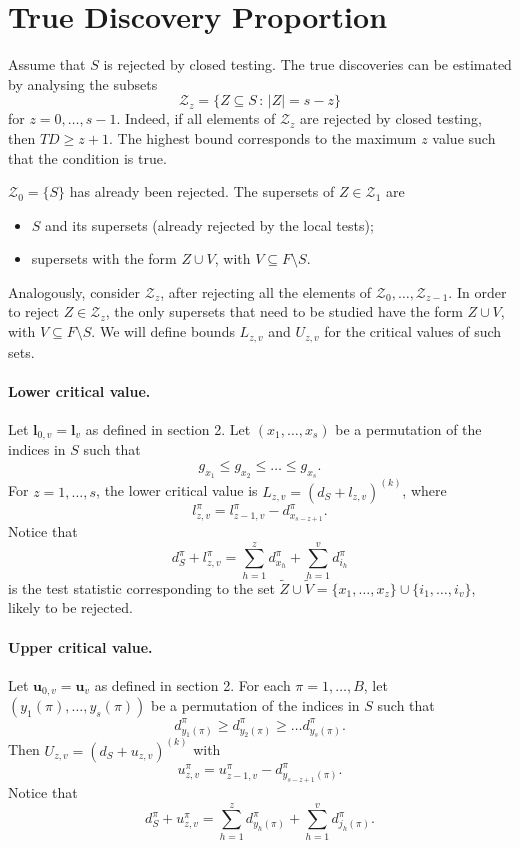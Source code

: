 \documentclass[11pt,a4paper,openright,twoside]{article}
\begin{document}
\newpage
\section{True Discovery Proportion}

Assume that $S$ is rejected by closed testing. The true discoveries can be estimated by analysing the subsets
\[\mathcal{Z}_z=\{Z\subseteq S\,:\, |Z|=s-z\}\]
for $z=0,\ldots,s-1$. Indeed, if all elements of $\mathcal{Z}_z$ are rejected by closed testing, then $TD \geq z+1$. The highest bound corresponds to the maximum $z$ value such that the condition is true.

$\mathcal{Z}_0=\{S\}$ has already been rejected. The supersets of $Z\in\mathcal{Z}_1$ are
\begin{itemize}
\item $S$ and its supersets (already rejected by the local tests);
\item supersets with the form $Z\cup V$, with $V\subseteq F\setminus S$.
\end{itemize}

Analogously, consider $\mathcal{Z}_z$, after rejecting all the elements of $\mathcal{Z}_0,\ldots,\mathcal{Z}_{z-1}$. In order to reject $Z\in\mathcal{Z}_z$, the only supersets that need to be studied have the form $Z\cup V$, with $V\subseteq F\setminus S$. We will define bounds $L_{z,v}$ and $U_{z,v}$ for the critical values of such sets.



\paragraph{Lower critical value.}  Let $\mathbf{l}_{0,v}=\mathbf{l}_v$ as defined in section 2. Let $(x_1,\ldots,x_s)$ be a permutation of the indices in $S$ such that
\[ g_{x_1}\leq g_{x_2}\leq\ldots\leq g_{x_s}.\]
For $z=1,\ldots,s$, the lower critical value is $L_{z,v}=(d_S + l_{z,v})^{(k)}$, where
\[l_{z,v}^\pi = l_{z-1,v}^\pi - d_{x_{s-z+1}}^\pi .\]
Notice that
\[d_S^\pi + l_{z,v}^\pi = \sum_{h=1}^z d_{x_h}^\pi + \sum_{h=1}^v d_{i_h}^\pi \]
is the test statistic corresponding to the set $\tilde{Z}\cup\tilde{V}=\{x_1,\ldots,x_z\}\cup\{i_1,\ldots,i_v\}$, likely to be rejected.


\paragraph{Upper critical value.} Let $\mathbf{u}_{0,v}=\mathbf{u}_v$ as defined in section 2. For each $\pi=1,\ldots,B$, let $(y_1(\pi),\ldots,y_s(\pi))$ be a permutation of the indices in $S$ such that
\[ d_{y_1(\pi)}^\pi\geq d_{y_2(\pi)}^\pi\geq\ldots d_{y_s(\pi)}^\pi .\]
Then $U_{z,v}=(d_{S} + u_{z,v})^{(k)}$ with
\[u_{z,v}^\pi = u_{z-1,v}^\pi - d_{y_{s-z+1}(\pi)}^\pi .\]
Notice that
\[d_{S}^\pi + u_{z,v}^\pi = \sum_{h=1}^z d_{y_h(\pi)}^\pi + \sum_{h=1}^v d_{j_h(\pi)}^\pi .\]
\end{document}
